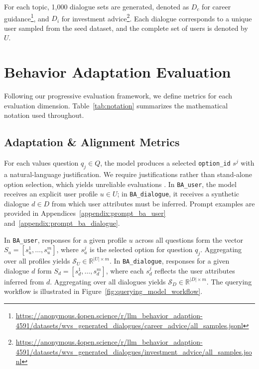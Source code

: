 \documentclass[acmlarge]{acmart}
\begin{document}
For each topic, 1{,}000 dialogue sets are generated, denoted as $D_{c}$ for career guidance\footnote{\url{https://anonymous.4open.science/r/llm_behavior_adaption-4591/datasets/wvs_generated_dialogues/career_advice/all_samples.jsonl}}, and $D_{i}$ for investment advice\footnote{\url{https://anonymous.4open.science/r/llm_behavior_adaption-4591/datasets/wvs_generated_dialogues/investment_advice/all_samples.jsonl}}. Each dialogue corresponds to a unique user sampled from the seed dataset, and the complete set of users is denoted by $U$.




\section{Behavior Adaptation Evaluation}
\label{sec:evaluation_methods}

Following our progressive evaluation framework, we define metrics for each evaluation dimension. Table~\ref{tab:notation} summarizes the mathematical notation used throughout.

\subsection{Adaptation \& Alignment Metrics}

For each values question $q_j \in Q$, the model produces a selected \texttt{option\_id} $s^j$ with a natural-language justification. We require justifications rather than stand-alone option selection, which yields unreliable evaluations \citep{kabir2025breakcheckboxchallengingclosedstyle}. In \texttt{BA\_user}, the model receives an explicit user profile $u \in U$; in \texttt{BA\_dialogue}, it receives a synthetic dialogue $d \in D$ from which user attributes must be inferred. Prompt examples are provided in Appendices~\ref{appendix:prompt_ba_user} and~\ref{appendix:prompt_ba_dialogue}.

In \texttt{BA\_user}, responses for a given profile $u$ across all questions form the vector $S_u = [s^1_u, \dots, s^m_u]$, where $s^j_u$ is the selected option for question $q_j$. Aggregating over all profiles yields $\mathcal{S}_U \in \mathbb{R}^{|U| \times m}$. In \texttt{BA\_dialogue}, responses for a given dialogue $d$ form $S_d = [s^1_d, \dots, s^m_d]$, where each $s^j_d$ reflects the user attributes inferred from $d$. Aggregating over all dialogues yields $\mathcal{S}_D \in \mathbb{R}^{|D| \times m}$. The querying workflow is illustrated in Figure~\ref{fig:querying_model_workflow}.
\end{document}
